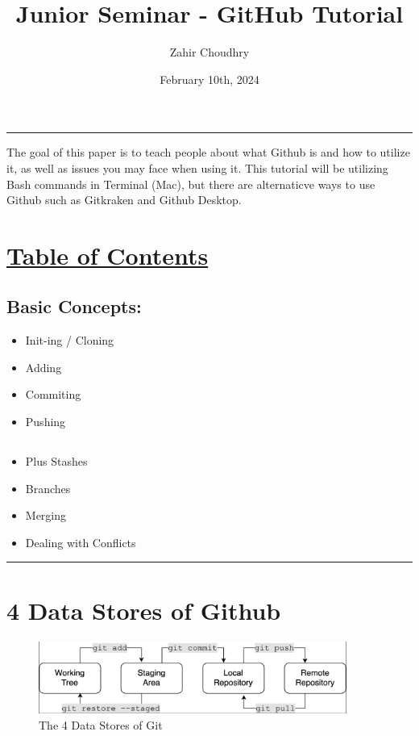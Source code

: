 \documentclass{article}
\title{Junior Seminar - GitHub Tutorial}
\author{Zahir Choudhry}
\date{February 10th, 2024}
\begin{document}
\maketitle
\hrule

\vspace{15pt}
\centering The goal of this paper is to teach people about what Github is and how to utilize it, as well as issues you may face when using it.
This tutorial will be utilizing Bash commands in Terminal (Mac), but there are alternaticve ways to use Github such as Gitkraken and Github Desktop.

\vspace{15pt}

\section*{\underline{Table of Contents}}
\subsection*{{Basic Concepts:}}

\begin{itemize}
\item Init-ing / Cloning
\item Adding
\item Commiting
\item Pushing

\subsection*{}
\item Plus Stashes
\item Branches
\item Merging
\item Dealing with Conflicts
\end{itemize}

\vspace{10pt}

\hrule

\vspace{5pt}   

\vspace{20pt}
\section*{4 Data Stores of Github}

\vspace{15pt}
\begin{figure}[h]
    \centering
    \includegraphics[width=0.9\textwidth]{Map.png}
    \caption{ The 4 Data Stores of Git}
    \label{fig:example}
\end{figure}
\end{document}
